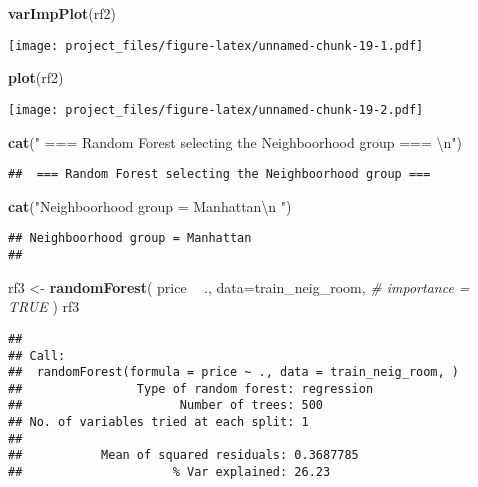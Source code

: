 \documentclass[
]{article}
\newenvironment{Shaded}{\begin{snugshade}}{\end{snugshade}}
\newcommand{\CharTok}[1]{\textcolor[rgb]{0.31,0.60,0.02}{#1}}
\newcommand{\CommentTok}[1]{\textcolor[rgb]{0.56,0.35,0.01}{\textit{#1}}}
\newcommand{\DataTypeTok}[1]{\textcolor[rgb]{0.13,0.29,0.53}{#1}}
\newcommand{\KeywordTok}[1]{\textcolor[rgb]{0.13,0.29,0.53}{\textbf{#1}}}
\newcommand{\NormalTok}[1]{#1}
\newcommand{\OperatorTok}[1]{\textcolor[rgb]{0.81,0.36,0.00}{\textbf{#1}}}
\newcommand{\StringTok}[1]{\textcolor[rgb]{0.31,0.60,0.02}{#1}}
\begin{document}
\begin{Shaded}
\begin{Highlighting}[]
\KeywordTok{varImpPlot}\NormalTok{(rf2)}
\end{Highlighting}
\end{Shaded}

\texttt{[image: project\_files/figure-latex/unnamed-chunk-19-1.pdf]}

\begin{Shaded}
\begin{Highlighting}[]
\KeywordTok{plot}\NormalTok{(rf2)}
\end{Highlighting}
\end{Shaded}

\texttt{[image: project\_files/figure-latex/unnamed-chunk-19-2.pdf]}

\begin{Shaded}
\begin{Highlighting}[]
\KeywordTok{cat}\NormalTok{(}\StringTok{" === Random Forest selecting the Neighboorhood group === }\CharTok{\textbackslash{}n}\StringTok{"}\NormalTok{)}
\end{Highlighting}
\end{Shaded}

\begin{verbatim}
##  === Random Forest selecting the Neighboorhood group ===
\end{verbatim}

\begin{Shaded}
\begin{Highlighting}[]
\KeywordTok{cat}\NormalTok{(}\StringTok{"Neighboorhood group = Manhattan}\CharTok{\textbackslash{}n}\StringTok{ "}\NormalTok{)}
\end{Highlighting}
\end{Shaded}

\begin{verbatim}
## Neighboorhood group = Manhattan
## 
\end{verbatim}

\begin{Shaded}
\begin{Highlighting}[]
\NormalTok{rf3 <-}\StringTok{ }\KeywordTok{randomForest}\NormalTok{(}
\NormalTok{  price }\OperatorTok{~}\StringTok{ }\NormalTok{.,}
  \DataTypeTok{data=}\NormalTok{train_neig_room,}
  \CommentTok{# importance = TRUE}
\NormalTok{)}
\NormalTok{rf3}
\end{Highlighting}
\end{Shaded}

\begin{verbatim}
## 
## Call:
##  randomForest(formula = price ~ ., data = train_neig_room, ) 
##                Type of random forest: regression
##                      Number of trees: 500
## No. of variables tried at each split: 1
## 
##           Mean of squared residuals: 0.3687785
##                     % Var explained: 26.23
\end{verbatim}
\end{document}
